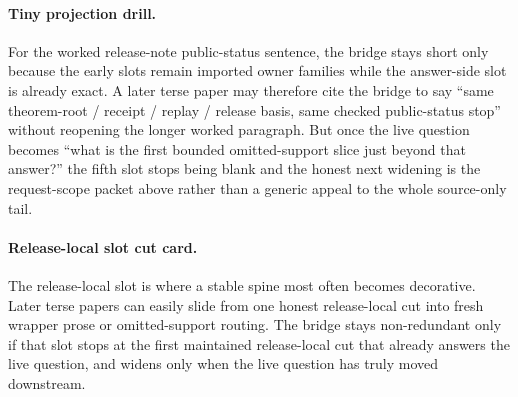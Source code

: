 \documentclass[11pt]{article}
\begin{document}
\paragraph{Tiny projection drill.}
For the worked release-note public-status sentence, the bridge stays short only because the early slots remain imported owner families while the answer-side slot is already exact. A later terse paper may therefore cite the bridge to say ``same theorem-root / receipt / replay / release basis, same checked public-status stop'' without reopening the longer worked paragraph. But once the live question becomes ``what is the first bounded omitted-support slice just beyond that answer?'' the fifth slot stops being blank and the honest next widening is the request-scope packet above rather than a generic appeal to the whole source-only tail.

\paragraph{Release-local slot cut card.}
The release-local slot is where a stable spine most often becomes decorative. Later terse papers can easily slide from one honest release-local cut into fresh wrapper prose or omitted-support routing. The bridge stays non-redundant only if that slot stops at the first maintained release-local cut that already answers the live question, and widens only when the live question has truly moved downstream.
\end{document}

